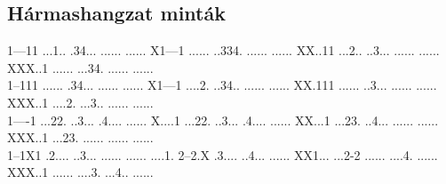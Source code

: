  
 
\pagestyle{empty}

\vspace*{\fill}
\subsection*{Hármashangzat minták}
           {1---11%
            ...1..%
            .34...%
            ......%
            ......} 
           {X1---1%
            ......%
            ..334.%
            ......%
            ......} 
           {XX..11%
            ...2..%
            ..3...%
            ......%
            ......} 
           {XXX..1%
            ......%
            ...34.%
            ......%
            ......}\\
           {1--111%
            ......%
            .34...%
            ......%
            ......} 
           {X1---1%
            ....2.%
            ..34..%
            ......%
            ......} 
           {XX.111%
            ......%
            ..3...%
            ......%
            ......} 
           {XXX..1%
            ....2.%
            ...3..%
            ......%
            ......}\\
           {1----1%
            ...22.%
            ..3...%
            .4....%
            ......} 
           {X....1%
            ...22.%
            ..3...%
            .4....%
            ......} 
           {XX...1%
            ...23.%
            ..4...%
            ......%
            ......} 
           {XXX..1%
            ...23.%
            ......%
            ......%
            ......}\\
           {1--1X1%
            .2....%
            ..3...%
            ......%
            ......} 
           {....1.%
            2--2.X%
            .3....%
            ..4...%
            ......} 
           {XX1...%
            ...2-2%
            ......%
            ....4.%
            ......} 
           {XXX..1%
            ......%
            ....3.%
            ...4..%
            ......}
\vspace*{\fill}

